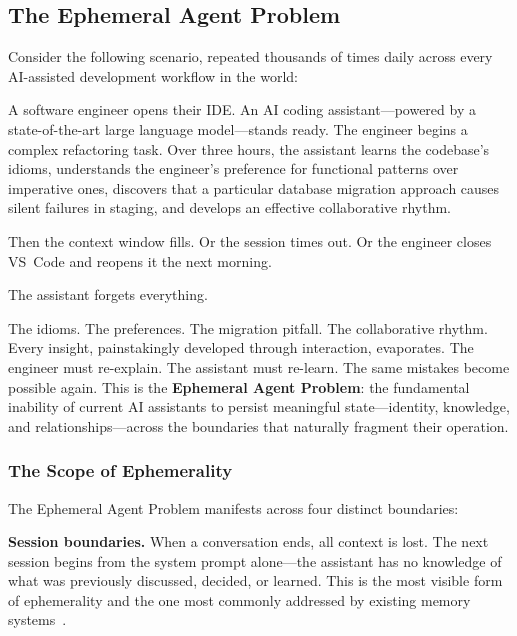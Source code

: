 \documentclass[11pt,a4paper]{article}
\begin{document}

\subsection{The Ephemeral Agent Problem}
\label{sec:ephemeral}

Consider the following scenario, repeated thousands of times daily across every AI-assisted development workflow in the world:

A software engineer opens their IDE. An AI coding assistant---powered by a state-of-the-art large language model---stands ready. The engineer begins a complex refactoring task. Over three hours, the assistant learns the codebase's idioms, understands the engineer's preference for functional patterns over imperative ones, discovers that a particular database migration approach causes silent failures in staging, and develops an effective collaborative rhythm.

Then the context window fills. Or the session times out. Or the engineer closes VS~Code and reopens it the next morning.

The assistant forgets everything.

The idioms. The preferences. The migration pitfall. The collaborative rhythm. Every insight, painstakingly developed through interaction, evaporates. The engineer must re-explain. The assistant must re-learn. The same mistakes become possible again. This is the \textbf{Ephemeral Agent Problem}: the fundamental inability of current AI assistants to persist meaningful state---identity, knowledge, and relationships---across the boundaries that naturally fragment their operation.


\subsubsection{The Scope of Ephemerality}
\label{sec:scope-ephemeral}

The Ephemeral Agent Problem manifests across four distinct boundaries:

\textbf{Session boundaries.} When a conversation ends, all context is lost. The next session begins from the system prompt alone---the assistant has no knowledge of what was previously discussed, decided, or learned. This is the most visible form of ephemerality and the one most commonly addressed by existing memory systems~\citep{packer2023memgpt,chhikara2025mem0}.
\end{document}
